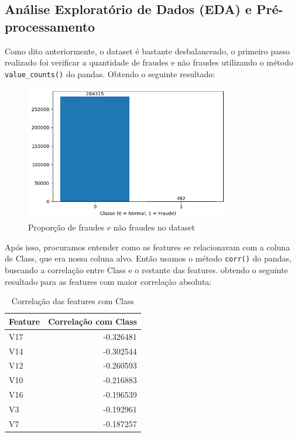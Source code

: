 \documentclass[a4paper,12pt]{article}
\begin{document}
\subsection{Análise Exploratório de Dados (EDA) e Pré-processamento}
\label{subsec:eda}
  Como dito anteriormente, o dataset é bastante desbalanceado, o primeiro passo realizado foi verificar a quantidade de fraudes e não fraudes utilizando o método \texttt{value\_counts()} do pandas. Obtendo o seguinte resultado:
  \begin{figure}[H]
    \centering
    \includegraphics[width=0.8\textwidth]{../output/proporcao_dados.png}
    \caption{Proporção de fraudes e não fraudes no dataset}
    \label{fig:proporcao_dados}
  \end{figure}
  Após isso, procuramos entender como as features se relacionavam com a coluna de Class, que era nossa coluna alvo. Então usamos o método \texttt{corr()} do pandas, buscando a correlação entre Class e o restante das features. obtendo o seguinte resultado para as features com maior correlação absoluta:
  \begin{table}[H]
    \centering
    \begin{tabular}{lr}
        \toprule
        \textbf{Feature} & \textbf{Correlação com Class} \\
        \midrule
        V17    & -0.326481 \\
        V14    & -0.302544 \\
        V12    & -0.260593 \\
        V10    & -0.216883 \\
        V16    & -0.196539 \\
        V3     & -0.192961 \\
        V7     & -0.187257 \\
        \bottomrule
    \end{tabular}
    \caption{Correlação das features com Class}
    \label{tab:correlacao_features}
\end{table}
\end{document}

